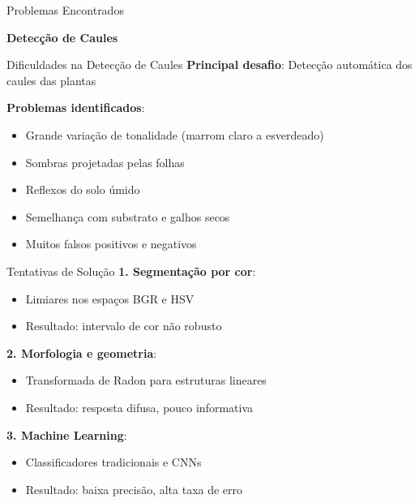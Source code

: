 \documentclass[landscape, 12pt]{beamer}
\begin{document}
\begin{frame}{Problemas Encontrados}
    \begin{center}
        \textbf{Detecção de Caules}
    \end{center}
\end{frame}

\begin{frame}{Dificuldades na Detecção de Caules}
    \textbf{Principal desafio}: Detecção automática dos caules das plantas
    
    \vspace{0.5cm}
    \textbf{Problemas identificados}:
    \begin{itemize}
        \item Grande variação de tonalidade (marrom claro a esverdeado)
        \item Sombras projetadas pelas folhas
        \item Reflexos do solo úmido
        \item Semelhança com substrato e galhos secos
        \item Muitos falsos positivos e negativos
    \end{itemize}
\end{frame}

\begin{frame}{Tentativas de Solução}
    \textbf{1. Segmentação por cor}:
    \begin{itemize}
        \item Limiares nos espaços BGR e HSV
        \item Resultado: intervalo de cor não robusto
    \end{itemize}
    
    \vspace{0.3cm}
    \textbf{2. Morfologia e geometria}:
    \begin{itemize}
        \item Transformada de Radon para estruturas lineares
        \item Resultado: resposta difusa, pouco informativa
    \end{itemize}
    
    \vspace{0.3cm}
    \textbf{3. Machine Learning}:
    \begin{itemize}
        \item Classificadores tradicionais e CNNs
        \item Resultado: baixa precisão, alta taxa de erro
    \end{itemize}
\end{frame}
\end{document}
